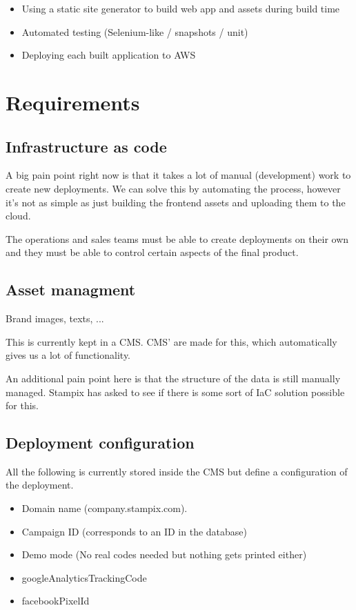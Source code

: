 \begin{itemize}
	\item Using a static site generator to build web app and assets during build time
	\item Automated testing (Selenium-like / snapshots / unit)
	\item Deploying each built application to AWS
\end{itemize}

\section{Requirements}

\subsection{Infrastructure as code}

A big pain point right now is that it takes a lot of manual (development) work to create new deployments.
We can solve this by automating the process, however it's not as simple as just building the frontend assets and uploading them to the cloud.

The operations and sales teams must be able to create deployments on their own and they must be able to control certain aspects of the final product.


\subsection{Asset managment}

Brand images, texts, ...

This is currently kept in a CMS. CMS' are made for this, which automatically gives us a lot of functionality. 

An additional pain point here is that the structure of the data is still manually managed. Stampix has asked to see if there is some sort of IaC solution possible for this.

\subsection{Deployment configuration}

All the following is currently stored inside the CMS but define a configuration of the deployment.

\begin{itemize}
	\item Domain name (company.stampix.com).
	\item Campaign ID (corresponds to an ID in the database)
	\item Demo mode (No real codes needed but nothing gets printed either)
	\item googleAnalyticsTrackingCode
	\item facebookPixelId
\end{itemize}

